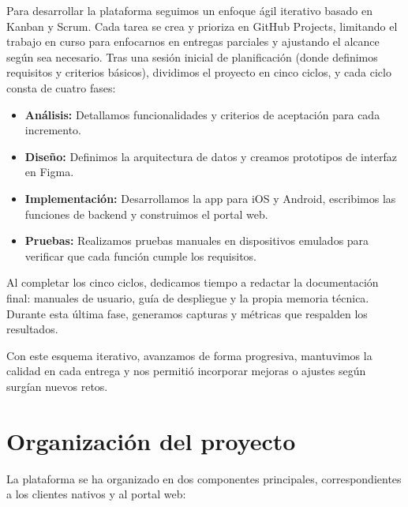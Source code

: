 \begin{large}

Para desarrollar la plataforma seguimos un enfoque ágil iterativo basado en Kanban y Scrum. Cada tarea se crea y prioriza en GitHub Projects, limitando el trabajo en curso para enfocarnos en entregas parciales y ajustando el alcance según sea necesario. Tras una sesión inicial de planificación (donde definimos requisitos y criterios básicos), dividimos el proyecto en cinco ciclos, y cada ciclo consta de cuatro fases:

\begin{itemize}
  \item \textbf{Análisis:} Detallamos funcionalidades y criterios de aceptación para cada incremento.
  \item \textbf{Diseño:} Definimos la arquitectura de datos y creamos prototipos de interfaz en Figma.
  \item \textbf{Implementación:} Desarrollamos la app para iOS y Android, escribimos las funciones de backend y construimos el portal web.  
  \item \textbf{Pruebas:} Realizamos pruebas manuales en dispositivos emulados para verificar que cada función cumple los requisitos.
\end{itemize}

Al completar los cinco ciclos, dedicamos tiempo a redactar la documentación final: manuales de usuario, guía de despliegue y la propia memoria técnica. Durante esta última fase, generamos capturas y métricas que respalden los resultados.

Con este esquema iterativo, avanzamos de forma progresiva, mantuvimos la calidad en cada entrega y nos permitió incorporar mejoras o ajustes según surgían nuevos retos.

\end{large}

\section{Organización del proyecto}

\begin{large}

La plataforma se ha organizado en dos componentes principales, correspondientes a los clientes nativos y al portal web:

\end{large}

